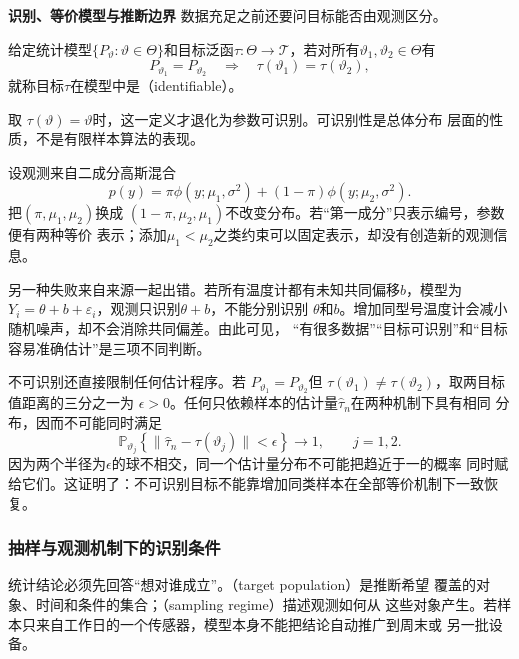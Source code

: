 \par\medskip\noindent\textbf{识别、等价模型与推断边界}\quad
数据充足之前还要问目标能否由观测区分。
\begin{definition}[目标可识别性]
  \label{def:statistics-identifiability}
  给定统计模型\(\{P_\vartheta:\vartheta\in\Theta\}\)和目标泛函\(\tau:\Theta\to\mathcal T\)，若对所有\(\vartheta_1,\vartheta_2\in\Theta\)有
\[
  P_{\vartheta_1}=P_{\vartheta_2}
  \quad\Longrightarrow\quad
  \tau(\vartheta_1)=\tau(\vartheta_2),
\]
就称目标\(\tau\)在模型中是（identifiable）。
\end{definition}
取
\(\tau(\vartheta)=\vartheta\)时，这一定义才退化为参数可识别。可识别性是总体分布
层面的性质，不是有限样本算法的表现。

\begin{example}[混合成分的标签交换]
\label{ex:statistics-mixture-label-switching}
设观测来自二成分高斯混合
\[
  p(y)=\pi\phi(y;\mu_1,\sigma^2)
       +(1-\pi)\phi(y;\mu_2,\sigma^2).
\]
把\((\pi,\mu_1,\mu_2)\)换成
\((1-\pi,\mu_2,\mu_1)\)不改变分布。若“第一成分”只表示编号，参数便有两种等价
表示；添加\(\mu_1<\mu_2\)之类约束可以固定表示，却没有创造新的观测信息。
\end{example}

另一种失败来自来源一起出错。若所有温度计都有未知共同偏移\(b\)，模型为
\(Y_i=\theta+b+\varepsilon_i\)，观测只识别\(\theta+b\)，不能分别识别
\(\theta\)和\(b\)。增加同型号温度计会减小随机噪声，却不会消除共同偏差。由此可见，
“有很多数据”“目标可识别”和“目标容易准确估计”是三项不同判断。

不可识别还直接限制任何估计程序。若
\(P_{\vartheta_1}=P_{\vartheta_2}\)但
\(\tau(\vartheta_1)\neq\tau(\vartheta_2)\)，取两目标值距离的三分之一为
\(\epsilon>0\)。任何只依赖样本的估计量\(\widehat\tau_n\)在两种机制下具有相同
分布，因而不可能同时满足
\[
  \mathbb{P}_{\vartheta_j}
  \left\{\lVert\widehat\tau_n-\tau(\vartheta_j)\rVert<\epsilon\right\}
  \longrightarrow1,\qquad j=1,2.
\]
因为两个半径为\(\epsilon\)的球不相交，同一个估计量分布不可能把趋近于一的概率
同时赋给它们。这证明了：不可识别目标不能靠增加同类样本在全部等价机制下一致恢复。

\subsubsection{抽样与观测机制下的识别条件}
\label{sec:statistics-sampling-population}
\label{sec:statistics-missingness-observation}
统计结论必须先回答“想对谁成立”。（target population）是推断希望
覆盖的对象、时间和条件的集合；（sampling regime）描述观测如何从
这些对象产生。若样本只来自工作日的一个传感器，模型本身不能把结论自动推广到周末或
另一批设备。

